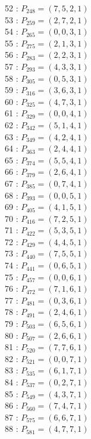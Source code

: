 \documentclass{article}
\begin{document}
{\begin{multicols}{3}
52 : $P_{248}=( 7, 5, 2, 1 )$\\
53 : $P_{259}=( 2, 7, 2, 1 )$\\
54 : $P_{265}=( 0, 0, 3, 1 )$\\
55 : $P_{275}=( 2, 1, 3, 1 )$\\
56 : $P_{283}=( 2, 2, 3, 1 )$\\
57 : $P_{293}=( 4, 3, 3, 1 )$\\
58 : $P_{305}=( 0, 5, 3, 1 )$\\
59 : $P_{316}=( 3, 6, 3, 1 )$\\
60 : $P_{325}=( 4, 7, 3, 1 )$\\
61 : $P_{329}=( 0, 0, 4, 1 )$\\
62 : $P_{342}=( 5, 1, 4, 1 )$\\
63 : $P_{349}=( 4, 2, 4, 1 )$\\
64 : $P_{363}=( 2, 4, 4, 1 )$\\
65 : $P_{374}=( 5, 5, 4, 1 )$\\
66 : $P_{379}=( 2, 6, 4, 1 )$\\
67 : $P_{385}=( 0, 7, 4, 1 )$\\
68 : $P_{393}=( 0, 0, 5, 1 )$\\
69 : $P_{405}=( 4, 1, 5, 1 )$\\
70 : $P_{416}=( 7, 2, 5, 1 )$\\
71 : $P_{422}=( 5, 3, 5, 1 )$\\
72 : $P_{429}=( 4, 4, 5, 1 )$\\
73 : $P_{440}=( 7, 5, 5, 1 )$\\
74 : $P_{441}=( 0, 6, 5, 1 )$\\
75 : $P_{457}=( 0, 0, 6, 1 )$\\
76 : $P_{472}=( 7, 1, 6, 1 )$\\
77 : $P_{481}=( 0, 3, 6, 1 )$\\
78 : $P_{491}=( 2, 4, 6, 1 )$\\
79 : $P_{503}=( 6, 5, 6, 1 )$\\
80 : $P_{507}=( 2, 6, 6, 1 )$\\
81 : $P_{520}=( 7, 7, 6, 1 )$\\
82 : $P_{521}=( 0, 0, 7, 1 )$\\
83 : $P_{535}=( 6, 1, 7, 1 )$\\
84 : $P_{537}=( 0, 2, 7, 1 )$\\
85 : $P_{549}=( 4, 3, 7, 1 )$\\
86 : $P_{560}=( 7, 4, 7, 1 )$\\
87 : $P_{575}=( 6, 6, 7, 1 )$\\
88 : $P_{581}=( 4, 7, 7, 1 )$\\
\end{multicols}


}
\end{document}
